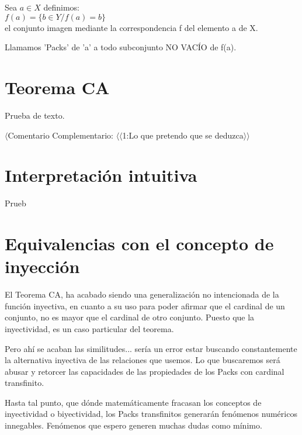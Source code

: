 \noindent Sea $a \in X$ definimos:\\
$f(a) = \{ b \in Y / f(a) = b \}$\\ 
el conjunto imagen mediante la correspondencia f del elemento a de X.

Llamamos 'Packs' de 'a' a todo subconjunto NO VACÍO de f(a).



\newpage
\section{Teorema CA}
Prueba de texto.


$\langle$Comentario Complementario: $\langle\langle$1:Lo que pretendo que se deduzca$\rangle\rangle$

\newpage
\section{Interpretación intuitiva}
Prueb

\newpage
\section{Equivalencias con el concepto de inyección}

El Teorema CA, ha acabado siendo una generalización no intencionada de la función inyectiva, en cuanto a su uso para poder afirmar que el cardinal de un conjunto, no es mayor que el cardinal de otro conjunto. Puesto que la inyectividad, es un caso particular del teorema.

Pero ahí se acaban las similitudes... sería un error estar buscando constantemente la alternativa inyectiva de las relaciones que usemos. Lo que buscaremos será abusar y retorcer las capacidades de las propiedades de los Packs con cardinal transfinito.

Hasta tal punto, que dónde matemáticamente fracasan los conceptos de inyectividad o biyectividad, los Packs transfinitos generarán fenómenos numéricos innegables. Fenómenos que espero generen muchas dudas como mínimo.
